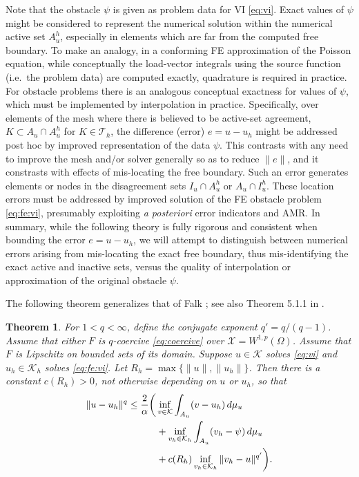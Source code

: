 \documentclass[]{interact}
\theoremstyle{plain}%
\newtheorem{theorem}{Theorem}[section]
\theoremstyle{definition}
\theoremstyle{remark}
\newcommand{\cK}{\mathcal{K}}
\newcommand{\cT}{\mathcal{T}}
\newcommand{\cX}{\mathcal{X}}
\begin{document}
Note that the obstacle $\psi$ is given as problem data for VI \eqref{eq:vi}.  Exact values of $\psi$ might be considered to represent the numerical solution within the numerical active set $A_u^h$, especially in elements which are far from the computed free boundary.  To make an analogy, in a conforming FE approximation of the Poisson equation, while conceptually the load-vector integrals using the source function (i.e.~the problem data) are computed exactly, quadrature is required in practice.  For obstacle problems there is an analogous conceptual exactness for values of $\psi$, which must be implemented by interpolation in practice.  Specifically, over elements of the mesh where there is believed to be active-set agreement, $K \subset A_u \cap A_u^h$ for $K\in\cT_h$, the difference (error) $e=u-u_h$ might be addressed post hoc by improved representation of the data $\psi$.  This contrasts with any need to improve the mesh and/or solver generally so as to reduce $\|e\|$, and it constrasts with effects of mis-locating the free boundary.  Such an error generates elements or nodes in the disagreement sets $I_u \cap A_u^h$ or $A_u \cap I_u^h$.  These location errors must be addressed by improved solution of the FE obstacle problem \eqref{eq:fe:vi}, presumably exploiting \emph{a posteriori} error indicators and AMR.  In summary, while the following theory is fully rigorous and consistent when bounding the error $e=u-u_h$, we will attempt to distinguish between numerical errors arising from mis-locating the exact free boundary, thus mis-identifying the exact active and inactive sets, versus the quality of interpolation or approximation of the original obstacle $\psi$.

The following theorem generalizes that of Falk \cite{Falk1974}; see also Theorem 5.1.1 in \cite{Ciarlet2002}.

\begin{theorem} \label{thm:genfalk}  For $1<q<\infty$, define the conjugate exponent $q'=q/(q-1)$.  Assume that either $F$ is $q$-coercive \eqref{eq:coercive} over $\cX=W^{1,p}(\Omega)$.  Assume that $F$ is Lipschitz on bounded sets of its domain.  Suppose $u\in\cK$ solves \eqref{eq:vi} and $u_h\in\cK_h$ solves \eqref{eq:fe:vi}.  Let $R_h=\max\{\|u\|,\|u_h\|\}$.  Then there is a constant $c(R_h)>0$, not otherwise depending on $u$ or $u_h$, so that
\begin{align}
\|u-u_h\|^q &\le \frac{2}{\alpha} \bigg( \inf_{v\in\cK} \int_{A_u} (v-u_h)\,d\mu_u \label{eq:falk} \\
   &\qquad\quad + \inf_{v_h\in\cK_h} \int_{A_u} (v_h-\psi)\,d\mu_u \notag \\
   &\qquad\quad + c(R_h) \inf_{v_h\in\cK_h} \|v_h - u\|^{q'}\bigg). \notag
\end{align}
\end{theorem}
\end{document}
